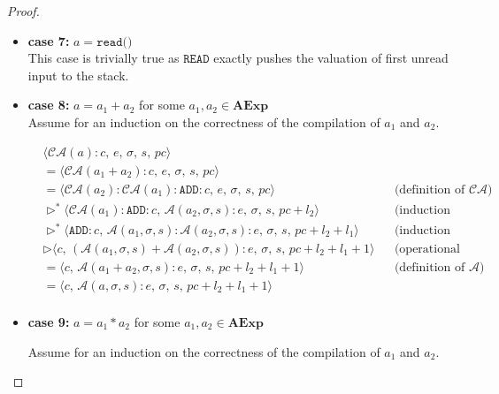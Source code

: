 \documentclass{article}
\begin{document}
\begin{proof}
\begin{itemize}
    \item \textbf{case 7: } $a = \texttt{read()}$ \\
    This case is trivially true as $\texttt{READ}$ exactly pushes the valuation of first unread input to the stack.

    \item \textbf{case 8: } $a = a_1 + a_2$ for some $a_1, a_2 \in \textbf{AExp}$ \\

    Assume for an induction on the correctness of the compilation of $a_1$ and $a_2$.

    \[
      \begin{aligned}
        &\langle  \mathcal{CA}(a) : c,\, e,\, \sigma,\, s,\, pc \rangle \\
        &= \langle \mathcal{CA}(a_1 + a_2) : c,\, e,\, \sigma,\, s,\, pc \rangle \\
        &= \langle \mathcal{CA}(a_2) : \mathcal{CA}(a_1) : \texttt{ADD} :  c,\, e,\, \sigma,\, s,\, pc \rangle 
        && \text{(definition of } \mathcal{CA}\text{)} \\
        &\triangleright^{\ast} \langle \mathcal{CA}(a_1) : \texttt{ADD} :  c,\, \mathcal{A}(a_2, \sigma, s) : e,\, \sigma,\, s,\, pc + l_2 \rangle 
        && \text{(induction hypothesis 2)} \\
        &\triangleright^{\ast} \langle \texttt{ADD} :  c,\, \mathcal{A}(a_1, \sigma, s) : \mathcal{A}(a_2, \sigma, s) : e,\, \sigma,\, s,\, pc + l_2 + l_1 \rangle
        && \text{(induction hypothesis 1)} \\
        &\triangleright \langle c,\, (\mathcal{A}(a_1, \sigma, s) + \mathcal{A}(a_2, \sigma, s)) : e,\, \sigma,\, s,\, pc + l_2 + l_1 + 1 \rangle
        && \text{(operational semantics)} \\
        &= \langle c,\, \mathcal{A}(a_1 + a_2, \sigma, s) : e,\, \sigma,\, s,\, pc + l_2 + l_1 + 1 \rangle
        && \text{(definition of } \mathcal{A}\text{)} \\
        &= \langle c,\, \mathcal{A}(a, \sigma, s) : e,\, \sigma,\, s,\, pc + l_2 + l_1 + 1 \rangle \\
      \end{aligned}
  \]

  \newpage
    \item \textbf{case 9: } $a = a_1 \ast a_2$ for some $a_1, a_2 \in \textbf{AExp}$

    Assume for an induction on the correctness of the compilation of $a_1$ and $a_2$.


\end{itemize}
\end{proof}
\end{document}
